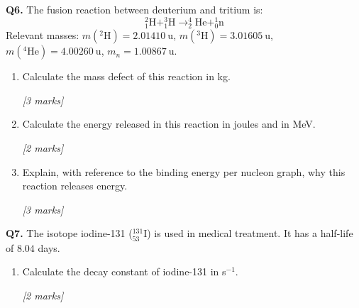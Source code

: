 \begin{tcolorbox}[colback=white, colframe=midblue, breakable]

\begin{minipage}{\linewidth}
\textbf{Q6.} The fusion reaction between deuterium and tritium is:
$$^{2}_{1}\text{H} + ^{3}_{1}\text{H} \rightarrow ^{4}_{2}\text{He} + ^{1}_{0}\text{n}$$
Relevant masses: $m(^2\text{H}) = 2.01410\ \text{u}$, $m(^3\text{H}) = 3.01605\ \text{u}$, $m(^4\text{He}) = 4.00260\ \text{u}$, $m_n = 1.00867\ \text{u}$.
\end{minipage}

\begin{enumerate}[label=(\alph*)]
  \item \begin{minipage}[t]{\linewidth}
  Calculate the mass defect of this reaction in kg.
  \par\hfill\textit{[3 marks]}
  \vspace{3.5cm}
  \end{minipage}

  \item \begin{minipage}[t]{\linewidth}
  Calculate the energy released in this reaction in joules and in MeV.
  \par\hfill\textit{[2 marks]}
  \vspace{3.5cm}
  \end{minipage}

  \item \begin{minipage}[t]{\linewidth}
  Explain, with reference to the binding energy per nucleon graph, why this reaction releases energy.
  \par\hfill\textit{[3 marks]}
  \vspace{4.0cm}
  \end{minipage}
\end{enumerate}

\begin{minipage}{\linewidth}
\textbf{Q7.} The isotope iodine-131 ($^{131}_{53}$I) is used in medical treatment. It has a half-life of $8.04$ days.
\end{minipage}

\begin{enumerate}[label=(\alph*)]
  \item \begin{minipage}[t]{\linewidth}
  Calculate the decay constant of iodine-131 in s$^{-1}$.
  \par\hfill\textit{[2 marks]}
  \vspace{3.0cm}
  \end{minipage}


\end{enumerate}
\end{tcolorbox}
